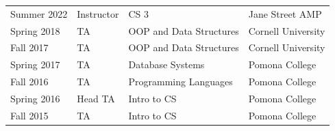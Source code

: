 \documentclass[]{deedy-resume-openfont}
\begin{document}
\begin{minipage}[t]{0.66\textwidth}
\begin{tabular}{llll}
    Summer 2022 & Instructor & CS 3 & Jane Street AMP \\
  
    Spring 2018 & TA & OOP and Data Structures & Cornell University \\
  
    Fall 2017 & TA & OOP and Data Structures & Cornell University \\
  
    Spring 2017 & TA & Database Systems & Pomona College \\
  
    Fall 2016 & TA & Programming Languages & Pomona College \\
  
    Spring 2016 & Head TA & Intro to CS & Pomona College \\
  
    Fall 2015 & TA & Intro to CS & Pomona College \\
  
\end{tabular}


\sectionsep

\end{minipage} 
\end{document}
